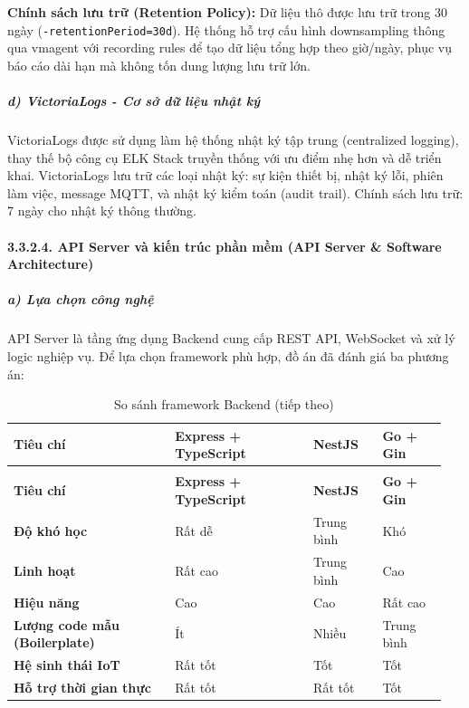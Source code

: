 \documentclass[a4paper]{extarticle}
\newcommand{\thesissettableid}[2]{%
  \renewcommand{\thetable}{#1}%
  \renewcommand{\theHtable}{#2}%
}
\begin{document}
\textbf{Chính sách lưu trữ (Retention Policy):} Dữ liệu thô được lưu trữ
trong 30 ngày (\texttt{-retentionPeriod=30d}). Hệ thống hỗ trợ cấu hình
downsampling thông qua vmagent với recording rules để tạo dữ liệu tổng
hợp theo giờ/ngày, phục vụ báo cáo dài hạn mà không tốn dung lượng lưu
trữ lớn.

\subparagraph{d) VictoriaLogs - Cơ sở dữ liệu nhật
ký}\label{d-victorialogs---cux1a1-sux1edf-dux1eef-liux1ec7u-nhux1eadt-kuxfd}

VictoriaLogs được sử dụng làm hệ thống nhật ký tập trung (centralized
logging), thay thế bộ công cụ ELK Stack truyền thống với ưu điểm nhẹ hơn
và dễ triển khai. VictoriaLogs lưu trữ các loại nhật ký: sự kiện thiết
bị, nhật ký lỗi, phiên làm việc, message MQTT, và nhật ký kiểm toán
(audit trail). Chính sách lưu trữ: 7 ngày cho nhật ký thông thường.

\paragraph{3.3.2.4. API Server và kiến trúc phần mềm (API Server \&
Software
Architecture)}\label{3234-api-server-vuxe0-kiux1ebfn-truxfac-phux1ea7n-mux1ec1m-api-server--software-architecture}

\subparagraph{a) Lựa chọn công
nghệ}\label{a-lux1ef1a-chux1ecdn-cuxf4ng-nghux1ec7}

API Server là tầng ứng dụng Backend cung cấp REST API, WebSocket và xử
lý logic nghiệp vụ. Để lựa chọn framework phù hợp, đồ án đã đánh giá ba
phương án:


{\thesissettableid{3.21}{tab-ch3-so-sanh-framework-backend}
\def\LTcaptype{table}
\begin{longtable}{|L{0.350\linewidth}|L{0.304\linewidth}|L{0.155\linewidth}|L{0.145\linewidth}|}
\caption{So sánh framework Backend}\label{tab:ch3-so-sanh-framework-backend}\\
\hline \textbf{Tiêu chí} & \textbf{Express + TypeScript} & \textbf{NestJS} & \textbf{Go + Gin} \\
\hline
\endfirsthead
\caption[]{So sánh framework Backend (tiếp theo)}\\
\hline \textbf{Tiêu chí} & \textbf{Express + TypeScript} & \textbf{NestJS} & \textbf{Go + Gin} \\
\hline
\endhead
\hline
\endfoot
\endlastfoot
\textbf{Độ khó học} & Rất dễ & Trung bình & Khó \\\hline
\textbf{Linh hoạt} & Rất cao & Trung bình & Cao \\\hline
\textbf{Hiệu năng} & Cao & Cao & Rất cao \\\hline
\textbf{Lượng code mẫu (Boilerplate)} & Ít & Nhiều & Trung bình \\\hline
\textbf{Hệ sinh thái IoT} & Rất tốt & Tốt & Tốt \\\hline
\textbf{Hỗ trợ thời gian thực} & Rất tốt & Rất tốt & Tốt \\\hline
\end{longtable}
}
\end{document}

